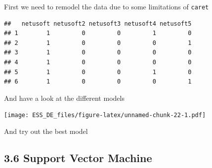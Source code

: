 \documentclass[
]{article}
\begin{document}
First we need to remodel the data due to some limitations of
\texttt{caret}

\begin{verbatim}
##   netusoft netusoft2 netusoft3 netusoft4 netusoft5
## 1        1         0         0         1         0
## 2        1         0         0         0         1
## 3        1         0         0         0         0
## 4        1         0         0         0         0
## 5        1         0         0         1         0
## 6        1         0         0         0         1
\end{verbatim}

And have a look at the different models

\texttt{[image: ESS\_DE\_files/figure-latex/unnamed-chunk-22-1.pdf]}

And try out the best model

\hypertarget{support-vector-machine}{%
\subsection{3.6 Support Vector Machine}\label{support-vector-machine}}
\end{document}
